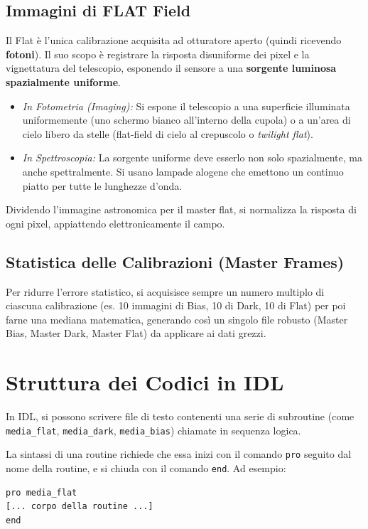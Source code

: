\subsection{Immagini di FLAT Field}
Il Flat è l'unica calibrazione acquisita ad otturatore aperto (quindi ricevendo \textbf{fotoni}). Il suo scopo è registrare la risposta disuniforme dei pixel e la vignettatura del telescopio, esponendo il sensore a una \textbf{sorgente luminosa spazialmente uniforme}.
\begin{itemize}
\item \textit{In Fotometria (Imaging):} Si espone il telescopio a una superficie illuminata uniformemente (uno schermo bianco all'interno della cupola) o a un'area di cielo libero da stelle (flat-field di cielo al crepuscolo o \textit{twilight flat}).
\item \textit{In Spettroscopia:} La sorgente uniforme deve esserlo non solo spazialmente, ma anche spettralmente. Si usano lampade alogene che emettono un continuo piatto per tutte le lunghezze d'onda.
\end{itemize}

Dividendo l'immagine astronomica per il master flat, si normalizza la risposta di ogni pixel, appiattendo elettronicamente il campo.

\subsection{Statistica delle Calibrazioni (Master Frames)}
Per ridurre l'errore statistico, si acquisisce sempre un numero multiplo di ciascuna calibrazione (es. 10 immagini di Bias, 10 di Dark, 10 di Flat) per poi farne una mediana matematica, generando così un singolo file robusto (Master Bias, Master Dark, Master Flat) da applicare ai dati grezzi.

\section{Struttura dei Codici in IDL}
In IDL, si possono scrivere file di testo contenenti una serie di subroutine (come \texttt{media\_flat}, \texttt{media\_dark}, \texttt{media\_bias}) chiamate in sequenza logica.

La sintassi di una routine richiede che essa inizi con il comando \texttt{pro} seguito dal nome della routine, e si chiuda con il comando \texttt{end}.
Ad esempio:
\begin{verbatim}
pro media_flat
[... corpo della routine ...]
end
\end{verbatim}

